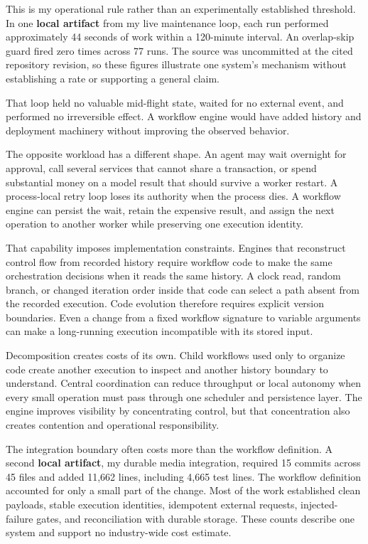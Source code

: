 This is my operational rule rather than an experimentally established threshold. In one \textbf{local artifact} from my live maintenance loop, each run performed approximately 44 seconds of work within a 120-minute interval. An overlap-skip guard fired zero times across 77 runs. The source was uncommitted at the cited repository revision, so these figures illustrate one system's mechanism without establishing a rate or supporting a general claim.

That loop held no valuable mid-flight state, waited for no external event, and performed no irreversible effect. A workflow engine would have added history and deployment machinery without improving the observed behavior.

The opposite workload has a different shape. An agent may wait overnight for approval, call several services that cannot share a transaction, or spend substantial money on a model result that should survive a worker restart. A process-local retry loop loses its authority when the process dies. A workflow engine can persist the wait, retain the expensive result, and assign the next operation to another worker while preserving one execution identity.

That capability imposes implementation constraints. Engines that reconstruct control flow from recorded history require workflow code to make the same orchestration decisions when it reads the same history. A clock read, random branch, or changed iteration order inside that code can select a path absent from the recorded execution. Code evolution therefore requires explicit version boundaries. Even a change from a fixed workflow signature to variable arguments can make a long-running execution incompatible with its stored input.

Decomposition creates costs of its own. Child workflows used only to organize code create another execution to inspect and another history boundary to understand. Central coordination can reduce throughput or local autonomy when every small operation must pass through one scheduler and persistence layer. The engine improves visibility by concentrating control, but that concentration also creates contention and operational responsibility.

The integration boundary often costs more than the workflow definition. A second \textbf{local artifact}, my durable media integration, required 15 commits across 45 files and added 11,662 lines, including 4,665 test lines. The workflow definition accounted for only a small part of the change. Most of the work established clean payloads, stable execution identities, idempotent external requests, injected-failure gates, and reconciliation with durable storage. These counts describe one system and support no industry-wide cost estimate.

